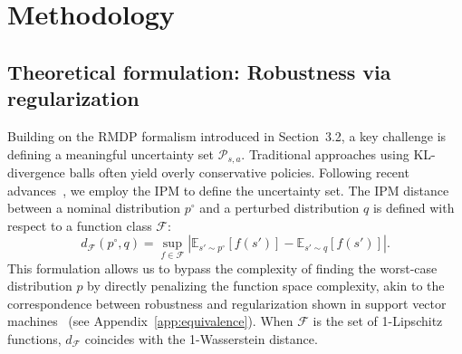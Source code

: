\documentclass[10pt]{article}
\begin{document}
\section{Methodology}

\subsection{Theoretical formulation: Robustness via regularization}
Building on the RMDP formalism introduced in Section~3.2, a key challenge is defining a meaningful uncertainty set $\mathcal{P}_{s,a}$. Traditional approaches using KL-divergence balls often yield overly conservative policies. Following recent advances~\cite{Zhou2023NaturalActorCritic}, we employ the IPM to define the uncertainty set. The IPM distance between a nominal distribution $p^\circ$ and a perturbed distribution $q$ is defined with respect to a function class $\mathcal{F}$:
\begin{equation}
    d_{\mathcal{F}}(p^\circ, q) = \sup_{f \in \mathcal{F}} \left| \mathbb{E}_{s' \sim p^\circ}[f(s')] - \mathbb{E}_{s' \sim q}[f(s')] \right|.
\end{equation}
This formulation allows us to bypass the complexity of finding the worst-case distribution $p$ by directly penalizing the function space complexity, akin to the correspondence between robustness and regularization shown in support vector machines~\cite{Xu2009RobustSVM} (see Appendix~\ref{app:equivalence}). When $\mathcal{F}$ is the set of 1-Lipschitz functions, $d_{\mathcal{F}}$ coincides with the 1-Wasserstein distance.
\end{document}
